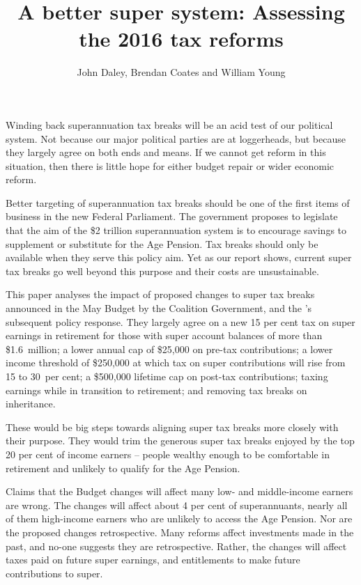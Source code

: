 \documentclass[continuous]{grattan}\usepackage[]{graphicx}\usepackage[]{color}
\title{A better super system: Assessing the 2016 tax reforms}
\author{John Daley, Brendan Coates and William Young}
\begin{document}
\addtolength{\columnsep}{3.5mm}
\begin{overview}[-2.2\baselineskip]
Winding back superannuation tax breaks will be an acid test of our political system. 
Not because our major political parties are at loggerheads, but because they largely agree on both ends and means. 
If we cannot get reform in this situation, then there is little hope for either budget repair or wider economic reform.

Better targeting of superannuation tax breaks should be one of the first items of business in the new Federal Parliament.
The government proposes to legislate that the aim of the \$2 trillion superannuation system is to encourage savings to supplement or substitute for the Age Pension.
Tax breaks should only be available when they serve this policy aim.
Yet as our \citeyear{DaleyCoatesWoodEtAl2015Super}  report shows, current super tax breaks go well beyond this purpose and their costs are unsustainable.

This paper analyses the impact of proposed changes to super tax breaks announced in the May Budget by the Coalition Government, and the \ALP{}’s subsequent policy response. 
They largely agree on a new 15 per cent tax on super earnings in retirement for those with super account balances of more than \$1.6~million; a lower annual cap of \$25,000 on pre-tax contributions; a lower income threshold of \$250,000 at which tax on super contributions will rise from 15 to 30~per cent; a \$500,000 lifetime cap on post-tax contributions; taxing earnings while in transition to retirement; and removing tax breaks on inheritance. 

These would be big steps towards aligning super tax breaks more closely with their purpose. 
They would trim the generous super tax breaks enjoyed by the top 20 per cent of income earners – people wealthy enough to be comfortable in retirement and unlikely to qualify for the Age Pension. 

Claims that the Budget changes will affect many low- and middle-income earners are wrong.
The changes will affect about 4 per cent of superannuants, nearly all of them high-income earners who are unlikely to access the Age Pension. 
Nor are the proposed changes retrospective.
Many reforms affect investments made in the past, and no-one suggests they are retrospective.
Rather, the changes will affect taxes paid on future super earnings, and entitlements to make future contributions to super. 


\end{overview}
\end{document}
